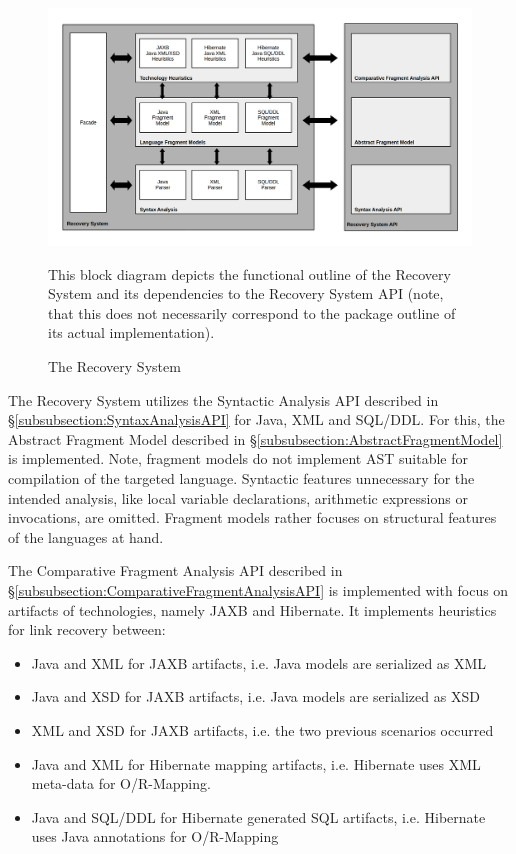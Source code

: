 \begin{figure}[h!]
\begin{center}
\includegraphics[width=\textwidth]{images/RecoverySystem.png}
\end{center}
{
\scriptsize
This block diagram depicts the functional outline of the Recovery System and its dependencies to the Recovery System \gls{API} (note, that this does not necessarily correspond to the package outline of its actual implementation).
}
\caption{The Recovery System}
\label{figure:RecoverySystem}
\end{figure}

The Recovery System utilizes the Syntactic Analysis \gls{API} described in §\ref{subsubsection:SyntaxAnalysisAPI} for \gls{Java}, \gls{XML} and \gls{SQL/DDL}.
For this, the Abstract Fragment Model described in §\ref{subsubsection:AbstractFragmentModel} is implemented.
Note, fragment models do not implement \gls{AST} suitable for compilation of the targeted language.
Syntactic features unnecessary for the intended analysis, like local variable declarations, arithmetic expressions or invocations, are omitted.
Fragment models rather focuses on structural features of the languages at hand.

The Comparative Fragment Analysis \gls{API} described in §\ref{subsubsection:ComparativeFragmentAnalysisAPI} is implemented with focus on artifacts of technologies, namely \gls{JAXB} and \gls{Hibernate}.
It implements heuristics for link recovery between:
\begin{itemize}
\item
\gls{Java} and \gls{XML} for \gls{JAXB} artifacts, i.e. \gls{Java} models are serialized as \gls{XML}
\item
\gls{Java} and \gls{XSD} for \gls{JAXB} artifacts, i.e. \gls{Java} models are serialized as \gls{XSD}
\item
\gls{XML} and \gls{XSD} for \gls{JAXB} artifacts, i.e. the two previous scenarios occurred
\item
\gls{Java} and \gls{XML} for \gls{Hibernate} mapping artifacts, i.e. \gls{Hibernate} uses \gls{XML} meta-data for \gls{O/R-Mapping}.
\item
\gls{Java} and \gls{SQL/DDL} for \gls{Hibernate} generated \gls{SQL} artifacts, i.e. \gls{Hibernate} uses \gls{Java} annotations for \gls{O/R-Mapping}
\end{itemize}

